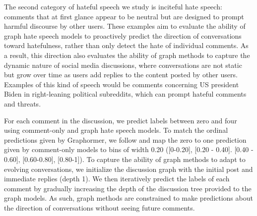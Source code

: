 \documentclass[letterpaper]{article} %
\begin{document}
The second category of hateful speech we study is inciteful hate speech: comments that at first glance appear to be neutral but are designed to prompt harmful discourse by other users. These examples aim to evaluate the ability of graph hate speech models to proactively predict the direction of conversations toward hatefulness, rather than only detect the hate of individual comments. As a result, this direction also evaluates the ability of graph methods to capture the dynamic nature of social media discussions, where conversations are not static but grow over time as users add replies to the content posted by other users. Examples of this kind of speech would be comments concerning US president Biden in right-leaning political subreddits, which can prompt hateful comments and threats.

For each comment in the discussion, we predict labels between zero and four using comment-only and graph hate speech models. To match the ordinal predictions given by Graphormer, we follow \citet{hebert2022predicting} and map the zero to one prediction given by comment-only models to bins of width 0.20 ([0-0.20], [0.20 - 0.40]. [0.40 - 0.60], [0.60-0.80], [0.80-1]). To capture the ability of graph methods to adapt to evolving conversations, we initialize the discussion graph with the initial post and immediate replies (depth 1). We then iteratively predict the labels of each comment by gradually increasing the depth of the discussion tree provided to the graph models. As such, graph methods are constrained to make predictions about the direction of conversations without seeing future comments.
\end{document}
